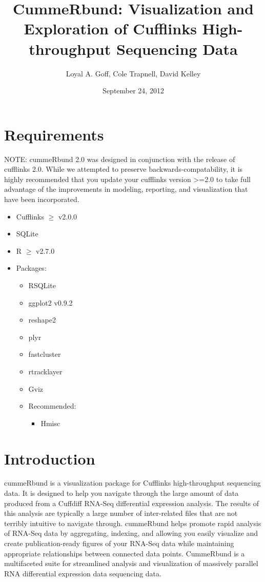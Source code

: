 \documentclass[10pt]{article}
\title{CummeRbund: Visualization and Exploration of Cufflinks High-throughput Sequencing Data}
\author{Loyal A. Goff, Cole Trapnell, David Kelley}
\date{September 24, 2012}
\newcommand{\Rpackage}[1]{\textsf{#1}}
\begin{document}
\maketitle
\tableofcontents
\clearpage
\section{Requirements}
NOTE: cummeRbund 2.0 was designed in conjunction with the release of cufflinks 2.0.  While we attempted to preserve backwards-compatability, it is highly recommended
that you update your cufflinks version >=2.0 to take full advantage of the improvements in modeling, reporting, and visualization that have been incorporated. 
\begin{itemize}
	\item Cufflinks $\ge$ v2.0.0
	\item SQLite 
	\item R $\ge$ v2.7.0
	\item Packages:
	\begin{itemize}
		\item \Rpackage{RSQLite}
		\item \Rpackage{ggplot2 v0.9.2}
		\item \Rpackage{reshape2}
		\item \Rpackage{plyr}
		\item \Rpackage{fastcluster}
        \item \Rpackage{rtracklayer}
        \item \Rpackage{Gviz}
		\item Recommended:
		\begin{itemize}
			\item \Rpackage{Hmisc}
		\end{itemize}
	\end{itemize}
\end{itemize}
	
\clearpage

\section{Introduction}
	\Rpackage{cummeRbund} is a visualization package for Cufflinks high-throughput sequencing data. It is designed to help you navigate through the large amount of data produced from a Cuffdiff RNA-Seq differential expression
	analysis. The results of this analysis are typically a large number of inter-related files that are not terribly intuitive to navigate through. cummeRbund helps promote rapid analysis of RNA-Seq data by aggregating, indexing,
	and allowing you easily visualize and create publication-ready figures of your RNA-Seq data while maintaining appropriate relationships between connected data points.
	CummeRbund is a multifaceted suite for streamlined analysis and visualization of massively parallel RNA differential expression data sequencing data. 
	
\end{document}
